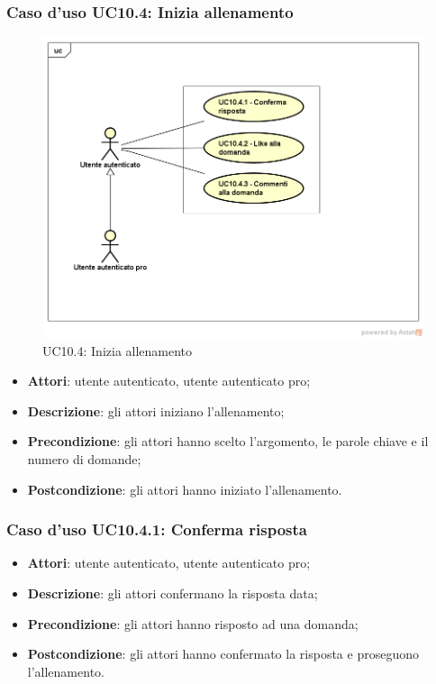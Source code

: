 \subsubsection{Caso d'uso UC10.4: Inizia allenamento}
\label{UC10.4}
\begin{figure}
	\centering
	\includegraphics[scale=0.5]{UML/UC10_4.png}
	\caption{UC10.4: Inizia allenamento}
\end{figure}
\FloatBarrier
	\begin{itemize}
		\item \textbf{Attori}: utente autenticato, utente autenticato pro;
		\item \textbf{Descrizione}: gli attori iniziano l'allenamento;
		\item \textbf{Precondizione}: gli attori hanno scelto l'argomento, le parole chiave e il numero di domande;
		\item \textbf{Postcondizione}: gli attori hanno iniziato l'allenamento.
	\end{itemize}
\subsubsection{Caso d'uso UC10.4.1: Conferma risposta}
	\begin{itemize}
		\item \textbf{Attori}: utente autenticato, utente autenticato pro;
		\item \textbf{Descrizione}: gli attori confermano la risposta data;
		\item \textbf{Precondizione}: gli attori hanno risposto ad una domanda;
		\item \textbf{Postcondizione}: gli attori hanno confermato la risposta e proseguono l'allenamento.
	\end{itemize}
